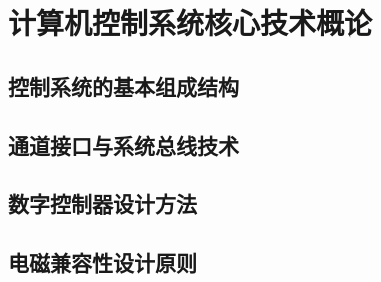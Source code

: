 \section{计算机控制系统核心技术概论}
\subsection{控制系统的基本组成结构}

\subsection{通道接口与系统总线技术}

\subsection{数字控制器设计方法}

\subsection{电磁兼容性设计原则}

\newpage